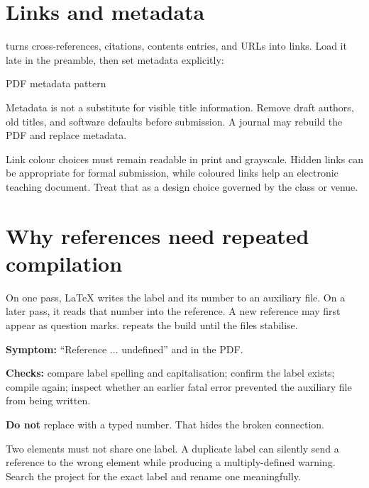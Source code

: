\section{Links and metadata}

 turns cross-references, citations, contents entries, and URLs
into links. Load it late in the preamble, then set metadata explicitly:

\begin{latexcode}{PDF metadata pattern}
\usepackage{hyperref}
\end{latexcode}

Metadata is not a substitute for visible title information. Remove draft
authors, old titles, and software defaults before submission. A journal may
rebuild the PDF and replace metadata.

Link colour choices must remain readable in print and grayscale. Hidden links
can be appropriate for formal submission, while coloured links help an
electronic teaching document. Treat that as a design choice governed by the
class or venue.

\section{Why references need repeated compilation}

On one pass, \LaTeX{} writes the label and its number to an auxiliary file. On a
later pass, it reads that number into the reference. A new reference may first
appear as question marks.  repeats the build until the files
stabilise.

\begin{commonerror}
\textbf{Symptom:} ``Reference ... undefined'' and  in the PDF.

\textbf{Checks:} compare label spelling and capitalisation; confirm the label
exists; compile again; inspect whether an earlier fatal error prevented the
auxiliary file from being written.

\textbf{Do not} replace  with a typed number. That hides the broken
connection.
\end{commonerror}

Two elements must not share one label. A duplicate label can silently send a
reference to the wrong element while producing a multiply-defined warning.
Search the project for the exact label and rename one meaningfully.

